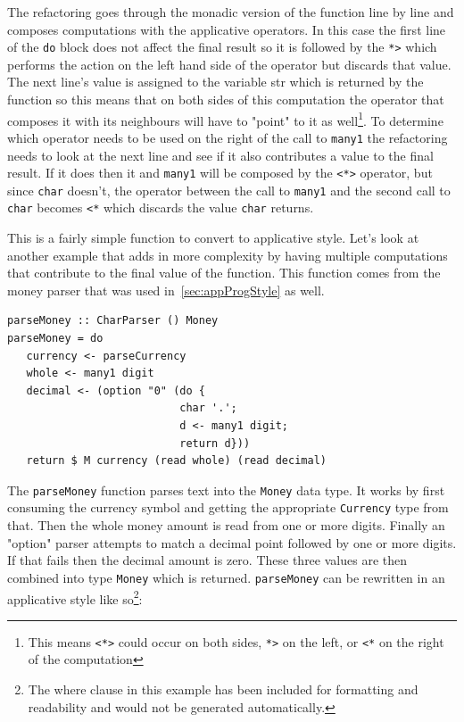 The refactoring goes through the monadic version of the function line by line and composes computations with the applicative operators. In this case the first line of the \texttt{do} block does not affect the final result so it is followed by the \texttt{*>} which performs the action on the left hand side of the operator but discards that value. The next line's value is assigned to the variable str which is returned by the function so this means that on both sides of this computation the operator that composes it with its neighbours will have to "point" to it as well\footnote{This means \texttt{<*>} could occur on both sides, \texttt{*>} on the left, or \texttt{<*} on the right of the computation}. To determine which operator needs to be used on the right of the call to \texttt{many1} the refactoring needs to look at the next line and see if it also contributes a value to the final result. If it does then it and \texttt{many1} will be composed by the \texttt{<*>} operator, but since \texttt{char} doesn't, the operator between the call to \texttt{many1} and the second call to \texttt{char} becomes \texttt{<*} which discards the value \texttt{char} returns.

This is a fairly simple function to convert to applicative style. Let's look at another example that adds in more complexity by having multiple computations that contribute to the final value of the function. This function comes from the money parser that was used in~\ref{sec:appProgStyle} as well. 
\pagebreak
\begin{lstlisting}[frame=tlrb]
parseMoney :: CharParser () Money
parseMoney = do
   currency <- parseCurrency 
   whole <- many1 digit
   decimal <- (option "0" (do { 
                           char '.';
                           d <- many1 digit;
                           return d}))
   return $ M currency (read whole) (read decimal)
\end{lstlisting}

The \texttt{parseMoney} function parses text into the \texttt{Money} data type. It works by first consuming the currency symbol and getting the appropriate \texttt{Currency} type from that. Then the whole money amount is read from one or more digits. Finally an "option" parser attempts to match a decimal point followed by one or more digits. If that fails then the decimal amount is zero. These three values are then combined into type \texttt{Money} which is returned. \texttt{parseMoney} can be rewritten in an applicative style like so\footnote{The where clause in this example has been included for formatting and readability and would not be generated automatically.}:

